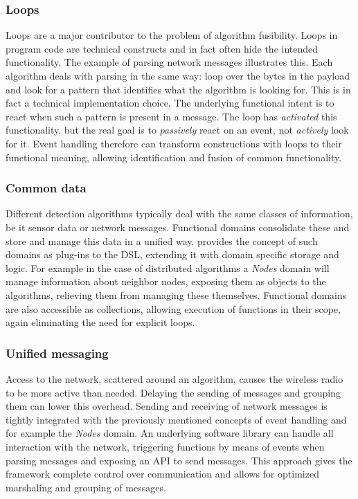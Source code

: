 \documentclass[3p,times,procedia]{elsarticle}
\begin{document}
\subsubsection{Loops}

Loops are a major contributor to the problem of algorithm fusibility. Loops in
program code are technical constructs and in fact often hide the intended
functionality. The example of parsing network messages illustrates this. Each
algorithm deals with parsing in the same way: loop over the bytes in the
payload and look for a pattern that identifies what the algorithm is looking
for. This is in fact a technical implementation choice. The underlying
functional intent is to react when such a pattern is present in a message. The
loop has \emph{activated} this functionality, but the real goal is to
\emph{passively} react on an event, not \emph{actively} look for it. Event
handling therefore can transform constructions with loops to their functional
meaning, allowing identification and fusion of common functionality.

\subsubsection{Common data}

Different detection algorithms typically deal with the same classes of
information, be it sensor data or network messages. Functional domains
consolidate these and store and manage this data in a unified way. \FOO
provides the concept of such domains as plug-ins to the DSL, extending it with
domain specific storage and logic. For example in the case of distributed
algorithms a \emph{Nodes} domain will manage information about neighbor nodes,
exposing them as objects to the algorithms, relieving them from managing these
themselves. Functional domains are also accessible as collections, allowing
execution of functions in their scope, again eliminating the need for explicit
loops.

\subsubsection{Unified messaging}
\label{dsl-unified-msg}

Access to the network, scattered around an algorithm, causes the wireless radio
to be more active than needed. Delaying the sending of messages and grouping
them can lower this overhead. Sending and receiving of network messages is
tightly integrated with the previously mentioned concepts of event handling and
for example the \emph{Nodes} domain. An underlying software library can handle
all interaction with the network, triggering functions by means of events when
parsing messages and exposing an API to send messages. This approach gives the
framework complete control over communication and allows for optimized
marshaling and grouping of messages.
\end{document}

